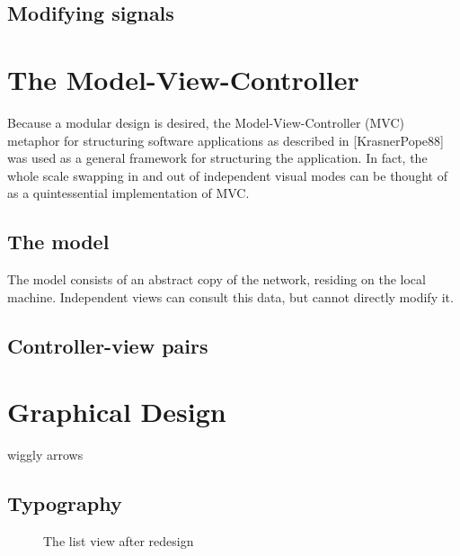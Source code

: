 \subsection{Modifying signals}

\section{The Model-View-Controller}
\label{sec:MVC}

	Because a modular design is desired, the Model-View-Controller (MVC) metaphor for structuring software applications as described in [KrasnerPope88] was used as a general framework for structuring the application. In fact, the whole scale swapping in and out of independent visual modes can be thought of as a quintessential implementation of MVC. 
	
\subsection{The model}

	The model consists of an abstract copy of the network, residing on the local machine. Independent views can consult this data, but cannot directly modify it.


\subsection{Controller-view pairs}

\section{Graphical Design}
	wiggly arrows
\subsection{Typography}

\begin{figure}[ht]
\centering
\caption{The list view after redesign} %
\label{fig:before_makeover}
\end{figure}

